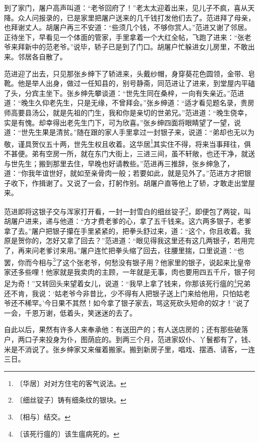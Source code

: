 \documentclass[12pt,UTF-8,openany]{ctexbook}
\begin{document}
\begin{large}
    到了家门，屠户高声叫道：“老爷回府了！”老太太迎着出来，见儿子不疯，喜从天降。众人问报录的，已是家里把屠户送来的几千钱打发他们去了。范进拜了母亲，也拜谢丈人。胡屠户再三不安道：“些须几个钱，不够你赏人。”范进又谢了邻居。正待坐下，早看见一个体面的管家，手里拿着一个大红全帖，飞跑了进来：“张老爷来拜新中的范老爷。”说毕，轿子已是到了门口。胡屠户忙躲进女儿房里，不敢出来。邻居各自散了。
    
    范进迎了出去，只见那张乡绅下了轿进来，头戴纱帽，身穿葵花色圆领，金带、皂靴。他是举人出身，做过一任知县的，别号静斋，同范进让了进来，到堂屋内平磕了头，分宾主坐下。张乡绅先攀谈道：“世先生同在桑梓，一向有失亲近。”范进道：“晚生久仰老先生，只是无缘，不曾拜会。”张乡绅道：“适才看见题名录，贵房师高要县汤公，就是先祖的门生，我和你是亲切的世弟兄。”范进道：“晚生侥幸，实是有愧。却幸得出老先生门下，可为欣喜。”张乡绅四面将眼睛望了一望，说道：“世先生果是清贫。”随在跟的家人手里拿过一封银子来，说道：“弟却也无以为敬，谨具贺仪五十两，世先生权且收着。这华居\footnote{〔华居〕对对方住宅的客气说法。}其实住不得，将来当事拜往，俱不甚便。弟有空房一所，就在东门大街上，三进三间，虽不轩敞，也还干净，就送与世先生；搬到那里去住，早晚也好请教些。”范进再三推辞，张乡绅急了，道：“你我年谊世好，就如至亲骨肉一般；若要如此，就是见外了。”范进方才把银子收下，作揖谢了。又说了一会，打躬作别。胡屠户直等他上了轿，才敢走出堂屋来。
    
    范进即将这银子交与浑家打开看，一封一封雪白的细丝锭子\footnote{〔细丝锭子〕铸有细条纹的银块。}，即便包了两锭，叫胡屠户进来，递与他道：“方才费老爹的心，拿了五千钱来。这六两多银子，老爹拿了去。”屠户把银子攥在手里紧紧的，把拳头舒过来，道：“这个，你且收着。我原是贺你的，怎好又拿了回去？”范进道：“眼见得我这里还有这几两银子，若用完了，再来问老爹讨来用。”屠户连忙把拳头缩了回去，往腰里揣，口里说道：“也罢，你而今相与\footnote{〔相与〕结交。}了这个张老爷，何愁没有银子用？他家里的银子，说起来比皇帝家还多些哩！他家就是我卖肉的主顾，一年就是无事，肉也要用四五千斤，银子何足为奇！”又转回头来望着女儿，说道：“我早上拿了钱来，你那该死行瘟的\footnote{〔该死行瘟的〕该生瘟病死的。}兄弟还不肯，我说：‘姑老爷今非昔比，少不得有人把银子送上门来给他用，只怕姑老爷还不稀罕。’今日果不其然！如今拿了银子家去，骂这死砍头短命的奴才！”说了一会，千恩万谢，低着头，笑迷迷的去了。
    
    自此以后，果然有许多人来奉承他：有送田产的；有人送店房的；还有那些破落户，两口子来投身为仆，图荫庇的。到两三个月，范进家奴仆、丫鬟都有了，钱、米是不消说了。张乡绅家又来催着搬家。搬到新房子里，唱戏、摆酒、请客，一连三日。
    
\end{large}
\end{document}
